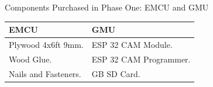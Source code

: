 \documentclass{beamer}
\begin{document}
\begin{frame} {Components Purchased in Phase One: EMCU and GMU}


    \renewcommand\arraystretch{1.75}
    \begin{tabularx} {\textwidth} {
            >{\centering \arraybackslash}X
            >{\centering \arraybackslash}X
        }

        \toprule

        \textbf{EMCU} & \textbf{GMU} \\
        \midrule

        Plywood 4x6ft 9mm.
        &
        ESP 32 CAM Module.
        \\

        Wood Glue.
        &
        ESP 32 CAM Programmer.
        \\

        Nails and Fasteners.
        &
        32 GB SD Card.
        \\

        \bottomrule

    \end{tabularx}


\end{frame}
\end{document}

